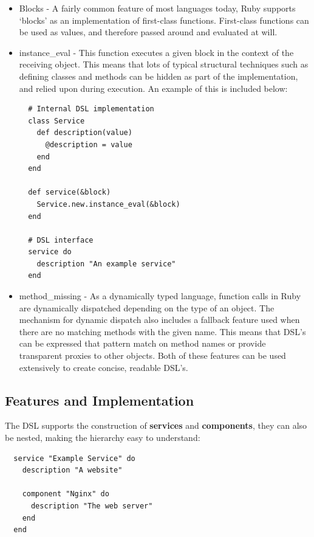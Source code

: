 \documentclass{cshonours}
\begin{document}
\begin{itemize}
  \item{Blocks} - A fairly common feature of most languages today, Ruby supports `blocks' as an implementation of first-class functions. First-class functions can be used as values, and therefore passed around and evaluated at will.

  \item{instance\_eval} - This function executes a given block in the context of the receiving object. This means that lots of typical structural techniques such as defining classes and methods can be hidden as part of the implementation, and relied upon during execution. An example of this is included below:

  \begin{verbatim}
  # Internal DSL implementation
  class Service
    def description(value)
      @description = value
    end
  end

  def service(&block)
    Service.new.instance_eval(&block)
  end

  # DSL interface
  service do
    description "An example service"
  end
  \end{verbatim}
  \label{fig:MetaProgrammingSnippet}

  \item{method\_missing} - As a dynamically typed language, function calls in Ruby are dynamically dispatched depending on the type of an object. The mechanism for dynamic dispatch also includes a fallback feature used when there are no matching methods with the given name. This means that DSL's can be expressed that pattern match on method names or provide transparent proxies to other objects. Both of these features can be used extensively to create concise, readable DSL's.
\end{itemize}

\subsection{Features and Implementation}

The DSL supports the construction of \textbf{services} and \textbf{components}, they can also be nested, making the hierarchy easy to understand:

\begin{verbatim}
  service "Example Service" do
    description "A website"

    component "Nginx" do
      description "The web server"
    end
  end
\end{verbatim}
\label{fig:MetaProgrammingSnippet}
\pagebreak
\end{document}
